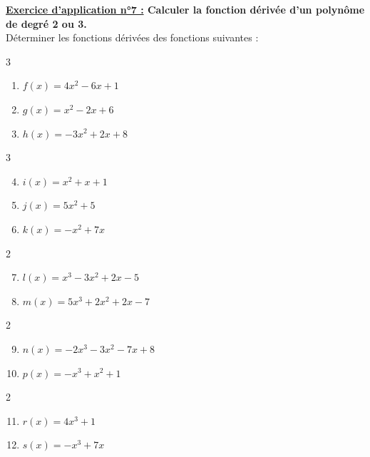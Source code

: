 \documentclass[12pt]{article}
\begin{document}
\begin{mdframed}[
    linewidth=1pt,
    roundcorner=5pt,
    linecolor=RoyalBlue,
    innertopmargin=10pt,
    innerbottommargin=10pt
]
{\color{RoyalBlue}\textbf{\underline{Exercice d'application n°7 :}
Calculer la fonction dérivée d'un polynôme de degré 2 ou 3.}}
\vspace{10pt}
\\
Déterminer les fonctions dérivées des fonctions suivantes :
\begin{multicols}{3}
    \begin{enumerate}[label=\alph*)]
        \item $f(x) = 4x^2 - 6x + 1$
        \item $g(x) = x^2 - 2x + 6$
        \item $h(x) = -3x^2 + 2x + 8$
    \end{enumerate}
\end{multicols}
\begin{multicols}{3}
    \begin{enumerate}[label=\alph*)]
        \setcounter{enumi}{3}
        \item $i(x) = x^2 + x + 1$
        \item $j(x) = 5x^2 + 5$
        \item $k(x) = -x^2 + 7x$
    \end{enumerate}
\end{multicols}
\begin{multicols}{2}
    \begin{enumerate}[label=\alph*)]
        \setcounter{enumi}{6}
        \item $l(x) = x^3 - 3x^2 + 2x - 5$
        \item $m(x) = 5x^3 + 2x^2 + 2x - 7$
    \end{enumerate}
\end{multicols}
\begin{multicols}{2}
    \begin{enumerate}[label=\alph*)]
        \setcounter{enumi}{8}
        \item $n(x) = -2x^3-3x^2-7x+8$
        \item $p(x) = -x^3 + x^2 + 1$
    \end{enumerate}
\end{multicols}
\begin{multicols}{2}
    \begin{enumerate}[label=\alph*)]
        \setcounter{enumi}{10}
        \item $r(x) = 4x^3+1$
        \item $s(x) = -x^3 + 7x$
    \end{enumerate}
\end{multicols}
\end{mdframed}
\end{document}
